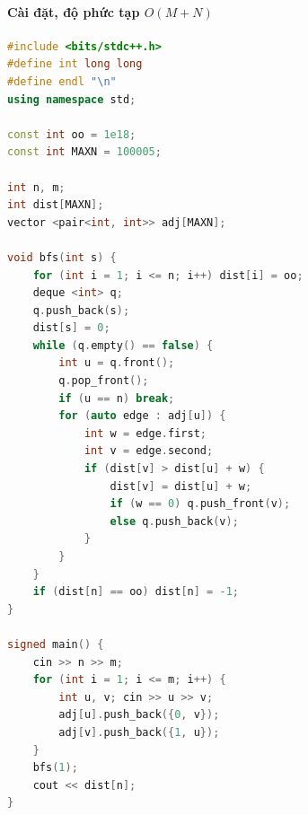 \paragraph{Cài đặt, độ phức tạp $O(M + N)$}
\begin{lstlisting}[language=C++]
#include <bits/stdc++.h>
#define int long long
#define endl "\n"
using namespace std;

const int oo = 1e18;
const int MAXN = 100005;

int n, m;
int dist[MAXN];
vector <pair<int, int>> adj[MAXN];

void bfs(int s) {
    for (int i = 1; i <= n; i++) dist[i] = oo;
    deque <int> q;
    q.push_back(s);
    dist[s] = 0;
    while (q.empty() == false) {
        int u = q.front();
        q.pop_front();
        if (u == n) break;
        for (auto edge : adj[u]) {
            int w = edge.first;
            int v = edge.second;
            if (dist[v] > dist[u] + w) {
                dist[v] = dist[u] + w;
                if (w == 0) q.push_front(v);
                else q.push_back(v);
            }
        }
    }
    if (dist[n] == oo) dist[n] = -1;
}

signed main() {
    cin >> n >> m;
    for (int i = 1; i <= m; i++) {
        int u, v; cin >> u >> v;
        adj[u].push_back({0, v});
        adj[v].push_back({1, u});
    }
    bfs(1);
    cout << dist[n];
}
\end{lstlisting}